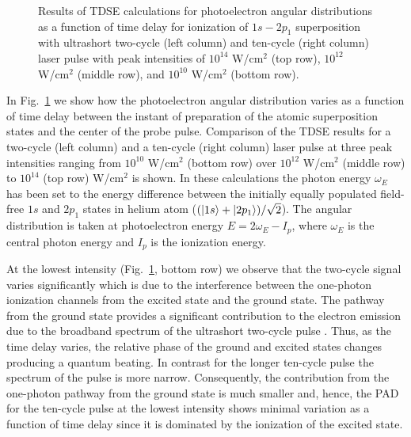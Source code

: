 \begin{figure}[t]
\centering
\caption{
Results of TDSE calculations for photoelectron angular distributions as a function of time delay for ionization of $1s - 2p_1$ superposition with ultrashort two-cycle (left column) and ten-cycle (right column) laser pulse with peak intensities of $10^{14}$ W/cm$^2$ (top row), $10^{12}$ W/cm$^2$ (middle row), and $10^{10}$ W/cm$^2$ (bottom row).
} 
  \label{fig:pad_vs_time}
\end{figure}

In Fig.~\ref{fig:pad_vs_time} we show how the photoelectron angular distribution varies as a function of time delay between the instant of preparation of the atomic superposition states and the center of the probe pulse. Comparison of the TDSE results for a two-cycle (left column) and a ten-cycle (right column) laser pulse at three peak intensities ranging from $10^{10}$ W/cm$^2$ (bottom row) over $10^{12}$ W/cm$^2$ (middle row) to $10^{14}$ (top row) W/cm$^2$ is shown. In these calculations the photon energy $\omega_E$ has been set to the energy difference between the initially equally populated field-free $1s$ and $2p_1$ states in helium atom ($(\ket{1s}+\ket{2p_1})/\sqrt{2}$). The angular distribution is taken at photoelectron energy $E = 2\omega_E - I_p$, where $\omega_E$ is the central photon energy and $I_p$ is the ionization energy.

At the lowest intensity (Fig.~\ref{fig:pad_vs_time}, bottom row) we observe that the two-cycle signal varies significantly which is due to the interference between the one-photon ionization channels from the excited state and the ground state. The pathway from the ground state provides a significant contribution to the electron emission due to the broadband spectrum of the ultrashort two-cycle pulse \cite{venzke_ionization_2020,venzke_asymmetry}. Thus, as the time delay varies, the relative phase of the ground and excited states changes producing a quantum beating. In contrast for the longer ten-cycle pulse the spectrum of the pulse is more narrow. Consequently, the contribution from the one-photon pathway from the ground state is much smaller and, hence, the PAD for the ten-cycle pulse at the lowest intensity shows minimal variation as a function of time delay since it is dominated by the ionization of the excited state. 

